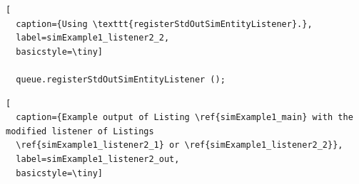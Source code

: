 \documentclass[12pt]{book}
\begin{document}
\begin{lstfloat}
\begin{lstlisting}[
  caption={Using \texttt{registerStdOutSimEntityListener}.},
  label=simExample1_listener2_2,
  basicstyle=\tiny]

  queue.registerStdOutSimEntityListener ();

\end{lstlisting}
\end{lstfloat}

\begin{lstfloat}
\begin{lstlisting}[
  caption={Example output of Listing \ref{simExample1_main} with the modified listener of Listings
  \ref{simExample1_listener2_1} or \ref{simExample1_listener2_2}},
  label=simExample1_listener2_out,
  basicstyle=\tiny]


\end{lstlisting}
\end{lstfloat}
\end{document}
